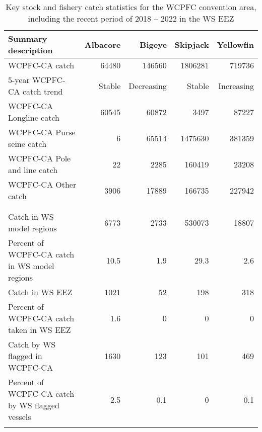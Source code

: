 \begin{longtable}{lrrrr}
\caption{Key stock and fishery catch statistics for the WCPFC convention area, including the recent period of 2018 -- 2022 in the WS EEZ} \\ 
  \hline
Summary description & Albacore & Bigeye & Skipjack & Yellowfin \\ 
  \hline
WCPFC-CA catch & 64480 & 146560 & 1806281 & 719736 \\ 
  5-year WCPFC-CA catch trend & Stable & Decreasing & Stable & Increasing \\ 
  WCPFC-CA Longline catch & 60545 & 60872 & 3497 & 87227 \\ 
  WCPFC-CA Purse seine catch & 6 & 65514 & 1475630 & 381359 \\ 
  WCPFC-CA Pole and line catch & 22 & 2285 & 160419 & 23208 \\ 
  WCPFC-CA Other catch & 3906 & 17889 & 166735 & 227942 \\ 
   &  &  &  &  \\ 
   \hline
 &  &  &  &  \\ 
  Catch in WS model regions & 6773 & 2733 & 530073 & 18807 \\ 
  Percent of WCPFC-CA catch in WS model regions & 10.5 & 1.9 & 29.3 & 2.6 \\ 
  Catch in WS EEZ & 1021 & 52 & 198 & 318 \\ 
  Percent of WCPFC-CA catch taken in WS EEZ & 1.6 & 0 & 0 & 0 \\ 
  Catch by WS flagged in WCPFC-CA & 1630 & 123 & 101 & 469 \\ 
  Percent of WCPFC-CA catch by WS flagged vessels & 2.5 & 0.1 & 0 & 0.1 \\ 
  \hline
\label{cat_sum_tab}
\end{longtable}
